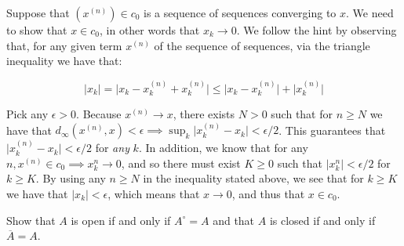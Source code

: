 \begin{solution}
    
    Suppose that $(x^{(n)}) \in c_0$ is a sequence of sequences converging to $x$.
    We need to show that $x \in c_0$, in other words that $x_k \rightarrow 0$.
    We follow the hint by observing that, for any given term $x^{(n)}$ of the sequence of sequences, via the triangle inequality we have that:

    $$\lvert x_k \rvert = \lvert x_k - x_{k}^{(n)} + x_{k}^{(n)} \rvert \leq \lvert x_k - x_k^{(n)} \rvert + \lvert x_k^{(n)} \rvert$$

    Pick any $\epsilon > 0$.
    Because $x^{(n)} \rightarrow x$, there exists $N > 0$ such that for $n \geq N$ we have that $d_{\infty}(x^{(n)}, x) < \epsilon \implies \sup_{k} \lvert x_k^{(n)} - x_k \rvert < \epsilon/2$.
    This guarantees that $\lvert x_k^{(n)} - x_k \rvert < \epsilon/2$ for \textit{any} $k$.
    In addition, we know that for any $n, x^{(n)} \in c_0 \implies x_k^{n} \rightarrow 0$, and so there must exist $K \geq 0$ such that $\lvert x_k^{n} \rvert < \epsilon/2$ for $k \geq K$.
    By using any $n \geq N$ in the inequality stated above, we see that for $k \geq K$ we have that $\lvert x_k \rvert < \epsilon$, which means that $x \rightarrow 0$, and thus that $x \in c_0$.
\end{solution}

\begin{exercise}{17}
    Show that $A$ is open if and only if $A^{\circ} = A$ and that $A$ is closed if and only if $\overline{A} = A$.
\end{exercise}

